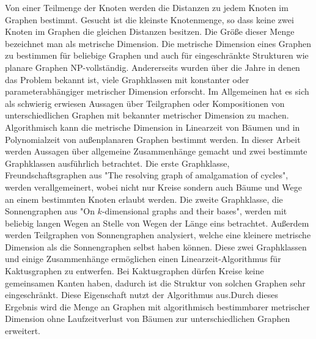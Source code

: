 Von einer Teilmenge der Knoten werden die Distanzen zu jedem Knoten im Graphen bestimmt. Gesucht ist die kleinste Knotenmenge, so dass keine zwei Knoten im Graphen die gleichen Distanzen besitzen. Die Größe dieser Menge bezeichnet man als metrische Dimension. Die metrische Dimension eines Graphen zu bestimmen für beliebige Graphen und auch für eingeschränkte Strukturen wie planare Graphen NP-vollständig.\newline\newline 
Andererseits wurden über die Jahre in denen das Problem bekannt ist, viele Graphklassen mit konstanter oder parameterabhängiger metrischer Dimension erforscht.\newline\newline 
Im Allgemeinen hat es sich als schwierig erwiesen Aussagen über Teilgraphen oder Kompositionen von unterschiedlichen Graphen mit bekannter metrischer Dimension zu machen. Algorithmisch kann die metrische Dimension in Linearzeit von Bäumen und in Polynomialzeit von außenplanaren Graphen bestimmt werden.\newline\newline
In dieser Arbeit werden Aussagen über allgemeine Zusammenhänge gemacht und zwei bestimmte Graphklassen ausführlich betrachtet.\newline\newline 
Die erste Graphklasse, Freundschaftsgraphen aus "The resolving graph of amalgamation of cycles"\cite{amal}, werden verallgemeinert, wobei nicht nur Kreise sondern auch Bäume und Wege an einem bestimmten Knoten erlaubt werden. Die zweite Graphklasse, die Sonnengraphen aus "On $k$-dimensional graphs and their bases"\cite{bases}, werden mit beliebig langen Wegen an Stelle von Wegen der Länge eins betrachtet. Außerdem werden Teilgraphen von Sonnengraphen analysiert, welche eine kleinere metrische Dimension als die Sonnengraphen selbst haben können.\newline\newline 
Diese zwei Graphklassen und einige Zusammenhänge ermöglichen einen Linearzeit-Algorithmus für Kaktusgraphen zu entwerfen. Bei Kaktusgraphen dürfen Kreise keine gemeinsamen Kanten haben, dadurch ist die Struktur von solchen Graphen sehr eingeschränkt. Diese Eigenschaft nutzt der Algorithmus aus.\newline\newline Durch dieses Ergebnis wird die Menge an Graphen mit algorithmisch bestimmbarer metrischer Dimension ohne Laufzeitverlust von Bäumen zur unterschiedlichen Graphen erweitert.

